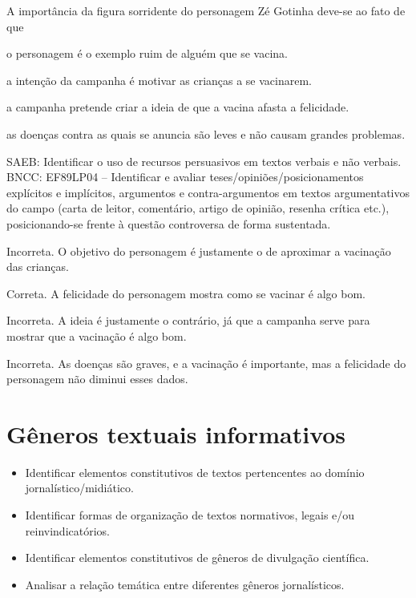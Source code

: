 A importância da figura sorridente do personagem Zé Gotinha deve-se ao
fato de que

\begin{escolha}
\tightlist
\item
  o personagem é o exemplo ruim de alguém que se vacina.
\item
  a intenção da campanha é motivar as crianças a se vacinarem.
\item
  a campanha pretende criar a ideia de que a vacina afasta a felicidade.
\item
  as doenças contra as quais se anuncia são leves e não causam grandes
  problemas.
\end{escolha}

SAEB: Identificar o uso de recursos persuasivos em textos verbais e não
verbais. BNCC: EF89LP04 -- Identificar e avaliar
teses/opiniões/posicionamentos explícitos e implícitos, argumentos e
contra-argumentos em textos argumentativos do campo (carta de leitor,
comentário, artigo de opinião, resenha crítica etc.), posicionando-se
frente à questão controversa de forma sustentada.

\begin{escolha}
\tightlist
\item
  Incorreta. O objetivo do personagem é justamente o de aproximar a
  vacinação das crianças.
\item
  Correta. A felicidade do personagem mostra como se vacinar é algo bom.
\item
  Incorreta. A ideia é justamente o contrário, já que a campanha serve
  para mostrar que a vacinação é algo bom.
\item
  Incorreta. As doenças são graves, e a vacinação é importante, mas a
  felicidade do personagem não diminui esses dados.
\end{escolha}

\chapter{Gêneros textuais informativos}


\begin{itemize}
\item Identificar elementos constitutivos de textos pertencentes ao domínio jornalístico/midiático.
\item Identificar formas de organização de textos normativos, legais e/ou reinvindicatórios.
\item Identificar elementos constitutivos de gêneros de divulgação científica.
\item Analisar a relação temática entre diferentes gêneros jornalísticos.
\end{itemize}


